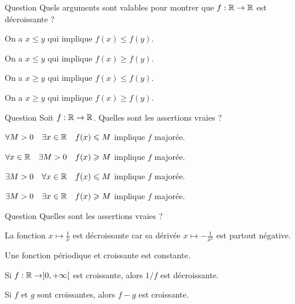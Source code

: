 \begin{multi}[multiple,feedback=
{Une fonction \(f\) est décroissante si \(x \le y\) implique \(f(x) \ge f(y)\).
Ce qui peut aussi s'écrire \(x \ge y\) qui implique \(f(x) \le f(y)\). 
Autrement dit \(f\) inverse le sens des inégalités.
}]{Question}
Quels arguments sont valables pour montrer que \(f : \mathbb{R} \to \mathbb{R}\) est décroissante ?

    \item On a \(x \le y\) qui implique \(f(x) \le f(y)\).
    \item* On a \(x \le y\) qui implique \(f(x) \ge f(y)\).
    \item* On a \(x \ge y\) qui implique \(f(x) \le f(y)\).
    \item On a \(x \ge y\) qui implique \(f(x) \ge f(y)\).
\end{multi}


\begin{multi}[multiple,feedback=
{Par définition \(f\) est majorée si \(\exists  M > 0 \quad \forall x \in \Rr \quad f(x) \le M\).
}]{Question}
Soit \(f : \mathbb{R} \to \mathbb{R}\). Quelles sont les assertions vraies ?

    \item \(\forall  M > 0 \quad \exists x \in \mathbb{R} \quad f(x) \leqslant M\)  implique \(f\) majorée.
    \item \(\forall  x \in \mathbb{R} \quad \exists  M > 0 \quad f(x) \geqslant M\)  implique \(f\) majorée.
    \item* \(\exists  M > 0 \quad \forall x \in \Rr \quad f(x) \le M\)  implique \(f\) majorée.
    \item \(\exists  M > 0 \quad \exists x \in \mathbb{R} \quad f(x) \geqslant M\)  implique \(f\) majorée.
\end{multi}


\begin{multi}{Question}
Quelles sont les assertions vraies ?

    \item La fonction \(x \mapsto \frac{1}{x}\) est décroissante car sa dérivée \(x \mapsto -\frac{1}{x^2}\) est partout négative.
    \item* Une fonction périodique et croissante est constante.
    \item* Si \(f : \mathbb{R} \to ]0,+\infty[\) est croissante, alors \(1/f\) est décroissante.
    \item Si \(f\) et \(g\) sont croissantes, alors \(f-g\) est croissante.
\end{multi}


